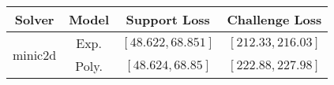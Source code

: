 \begin{tabular}{cc|c|c} 
\hline 
 Solver & Model & Support Loss  & Challenge Loss \tabularnewline\hline 
\hline 
\multirow{2}{*}{minic2d} & Exp. & $\mathbf{\left[48.622,68.851\right]}$ & $\mathbf{\left[212.33,216.03\right]}$ \tabularnewline 
 & Poly. & $\left[48.624,68.85\right]$ & $\left[222.88,227.98\right]$ \tabularnewline 
\hline 
\end{tabular} 

